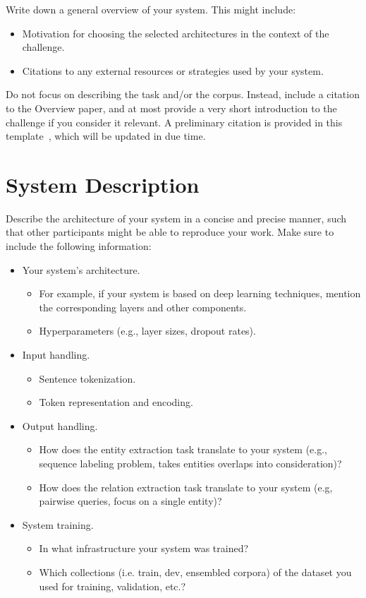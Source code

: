 \documentclass[]{llncs}
\begin{document}
Write down a general overview of your system. This might include:
\begin{itemize}
    \item Motivation for choosing the selected architectures in the context of the challenge.
    \item Citations to any external resources or strategies used by your system.
\end{itemize}

Do not focus on describing the task and/or the corpus. Instead, include a citation to the Overview paper, and at most provide a very short
introduction to the challenge if you consider it relevant.
A preliminary citation is provided in this template~\cite{overview}, which will be updated
in due time.


\section{System Description}

Describe the architecture of your system in a concise and precise manner, such that other participants might be able to reproduce your work.
Make sure to include the following information:

\begin{itemize}
    \item Your system's architecture.
        \begin{itemize}
            \item For example, if your system is based on deep learning techniques, mention the corresponding layers and other components.
            \item Hyperparameters (e.g., layer sizes, dropout rates).
        \end{itemize}
    \item Input handling.
        \begin{itemize}
            \item Sentence tokenization.
            \item Token representation and encoding.
        \end{itemize}
    \item Output handling.
        \begin{itemize}
            \item How does the entity extraction task translate to your system (e.g., sequence labeling problem, takes entities overlaps into consideration)?
            \item How does the relation extraction task translate to your system (e.g, pairwise queries, focus on a single entity)?
        \end{itemize}
    \item System training.
    \begin{itemize}
        \item In what infrastructure your system was trained?
        \item Which collections (i.e. train, dev, ensembled corpora) of the dataset you used for training, validation, etc.?
    \end{itemize}
\end{itemize}
\end{document}
